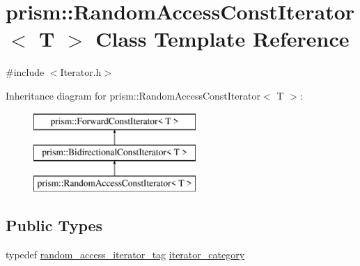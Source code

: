 \hypertarget{classprism_1_1_random_access_const_iterator}{}\section{prism\+:\+:Random\+Access\+Const\+Iterator$<$ T $>$ Class Template Reference}
\label{classprism_1_1_random_access_const_iterator}


{\ttfamily \#include $<$Iterator.\+h$>$}

Inheritance diagram for prism\+:\+:Random\+Access\+Const\+Iterator$<$ T $>$\+:\begin{figure}[H]
\begin{center}
\leavevmode
\includegraphics[height=3.000000cm]{classprism_1_1_random_access_const_iterator}
\end{center}
\end{figure}
\subsection*{Public Types}
\begin{DoxyCompactItemize}
\item 
typedef \hyperlink{structprism_1_1random__access__iterator__tag}{random\+\_\+access\+\_\+iterator\+\_\+tag} \hyperlink{classprism_1_1_random_access_const_iterator_a0c9e9823aea6ba3cc63c8e797d5b84b8}{iterator\+\_\+category}
\end{DoxyCompactItemize}
